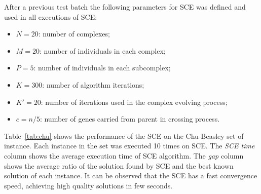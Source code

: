 After a previous test batch the following parameters for SCE was defined and used
in all executions of SCE:
\begin{itemize}
  \item $N = 20$: number of complexes;
  \item $M = 20$: number of individuals in each complex;
  \item $P = 5$: number of individuals in each subcomplex;
  \item $K = 300$: number of algorithm iterations;
  \item $K' = 20$: number of iterations used in the complex evolving process;
  \item $c = n/5$: number of genes carried from parent in crossing process.
\end{itemize}

Table~\ref{tab:chu} shows the performance of the SCE on the Chu-Beasley set of instance.
Each instance in the set was executed 10 times on SCE.
The \textit{SCE time} column shows the average execution time of SCE algorithm.
The \textit{gap} column shows the average ratio of the solution found by SCE and
the best known solution of each instance.
It can be observed that the SCE has a fast convergence speed, achieving high
quality solutions in few seconds.


